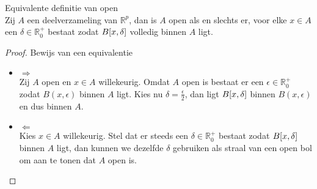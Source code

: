 \documentclass[main.tex]{subfiles}
\begin{document}
\begin{st}
  Equivalente definitie van open\\
  Zij $A$ een deelverzameling van $\mathbb{R}^{p}$, dan is $A$ open als en slechts er, voor elke $x\in A$ een $\delta\in\mathbb{R}_{0}^{+}$ bestaat zodat $B\interval{x}{\delta}$ volledig binnen $A$ ligt.

  \begin{proof}
    Bewijs van een equivalentie
    \begin{itemize}
    \item $\Rightarrow$\\
      Zij $A$ open en $x\in A$ willekeurig.
      Omdat $A$ open is bestaat er een $\epsilon \in \mathbb{R}_{0}^{+}$ zodat $B(x,\epsilon)$ binnen $A$ ligt.
      Kies nu $\delta = \frac{\epsilon}{2}$, dan ligt $B\interval{x}{\delta}$ binnen $B(x,\epsilon)$ en dus binnen $A$.
    \item $\Leftarrow$\\
      Kies $x\in A$ willekeurig.
      Stel dat er steeds een $\delta \in \mathbb{R}_{0}^{+}$ bestaat zodat $B\interval{x}{\delta}$ binnen $A$ ligt, dan kunnen we dezelfde $\delta$ gebruiken als straal van een open bol om aan te tonen dat $A$ open is.
    \end{itemize}
  \end{proof}
\end{st}
\end{document}
